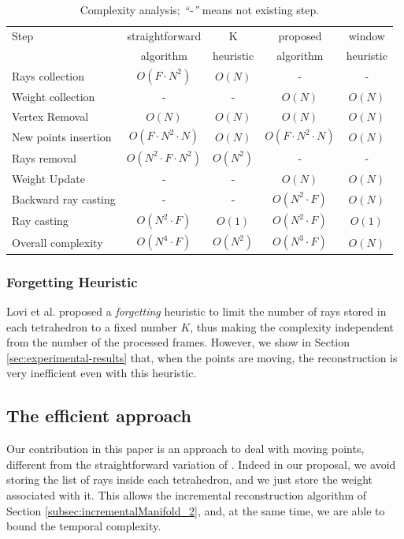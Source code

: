 \begin{table}[t]
\caption{Complexity analysis; \emph{``-''} means not existing step.}
\label{tab:ComStraight}
\centering
\begin{tabular}{lcccc}
\toprule 
Step                & straightforward     & K  & proposed     & window \\
                    & algorithm & heuristic & algorithm & heuristic \\
\midrule
Rays collection     &  $O(F\cdot N^2)$ & $O(N)$ &-&-\\
Weight collection    &-&- &  $O(N)$ & $O(N)$ \\
Vertex Removal      &  $O(N)$           & $O(N)$ &  $O(N)$           & $O(N)$ \\
New points insertion&  $O(F\cdot N^2 \cdot N)$ & $O(N)$ &  $O(F\cdot N^2 \cdot N)$ & $O(N)$ \\
Rays removal     &  $O(N^2\cdot F\cdot N^2)$ & $O(N^2)$ &-&-\\
Weight Update     &-&-&  $O(N)$ & $O(N)$ \\
Backward ray casting &-&-    &  $O(N^2\cdot F)$ & $O(N)$ \\
Ray casting     &  $O(N^2\cdot F)$ & $O(1)$ &  $O(N^2\cdot F)$ & $O(1)$ \\
\midrule
Overall complexity     &  $O(N^4\cdot F)$ & $O(N^2)$ &  $O(N^3\cdot F)$ & $O(N)$ \\
\end{tabular}
\end{table}

\subsubsection{Forgetting Heuristic}
Lovi et al. \cite{lovi_et_al_11} proposed a \emph{forgetting} heuristic to limit the number of rays stored in each tetrahedron to a fixed number $K$, thus making the complexity independent from the number of the processed frames. 
However, we show in Section \ref{sec:experimental-results} that, when the points are moving,  the reconstruction is very inefficient even with this heuristic.

\subsection{The efficient approach}
\label{subsec:efficient_way}
Our contribution in this paper is an approach to deal with moving points, different from the straightforward variation of \cite{lovi_et_al_11}. Indeed in our proposal, we avoid storing the list of rays inside each tetrahedron, and we just store the weight associated with it.
This allows the incremental reconstruction algorithm of Section \ref{subsec:incrementalManifold_2}, and, at the same time, we are able to bound the temporal complexity.

